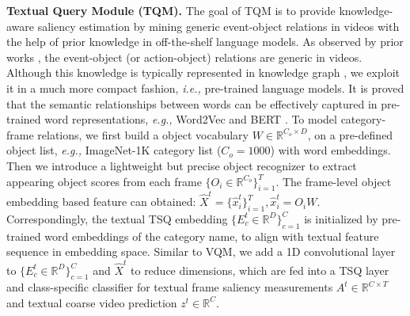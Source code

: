 \documentclass[runningheads]{llncs}
\begin{document}
\noindent\textbf{Textual Query Module (TQM).}
The goal of TQM is to provide knowledge-aware saliency estimation by mining generic event-object relations in videos with the help of prior knowledge in off-the-shelf language models. As observed by prior works \cite{15000object,smart2020}, the event-object (or action-object) relations are generic in videos. Although this knowledge is typically represented in knowledge graph \cite{image_text_matching}, we exploit it in a much more compact fashion, \emph{i.e.,} pre-trained language models.
It is proved that the semantic relationships between words can be effectively captured in pre-trained word representations, \emph{e.g.,} Word2Vec \cite{word2vec} and BERT \cite{bert}. To model category-frame relations, we first build a object vocabulary $W \in \mathbb{R}^{C_o\times D}$, on a pre-defined object list, \emph{e.g.,} ImageNet-1K category list ($C_o=1000$) with word embeddings. Then we introduce a lightweight but precise object recognizer to extract appearing object scores from each frame $\{O_i \in \mathbb{R}^{C_o} \}_{i=1}^T$. The frame-level object embedding based feature can obtained: $\hat{X}^{t}=\{\hat{x}_{i}^{t}\}_{i=1}^T, \hat{x}_{i}^{t}=O_i W$. Correspondingly, the textual TSQ embedding $\{E_c^t \in \mathbb{R}^D\}_{c=1}^{C}$ is initialized by pre-trained word embeddings of the category name, to align with textual feature sequence in embedding space. Similar to VQM, we add a 1D convolutional layer to $\{E^{t}_{c}\in \mathbb{R}^D\}_{c=1}^{C}$ and $\hat{X}^{t}$ to reduce dimensions, which are fed into a TSQ layer and class-specific classifier for textual frame saliency measurements $A^t \in \mathbb{R}^{C\times T}$ and textual coarse video prediction $z^t\in \mathbb{R}^C$.
\end{document}
